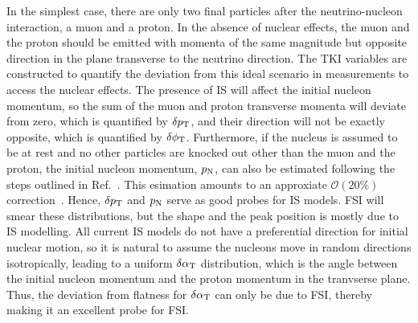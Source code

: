     In the simplest case, there are only two final particles after the neutrino-nucleon interaction, a muon and a proton. 
    In the absence of nuclear effects, the muon and the proton should be emitted with momenta of the same magnitude but opposite direction in the plane transverse to the neutrino direction.
    The TKI variables are constructed to quantify the deviation from this ideal scenario in measurements to access the nuclear effects. 
    The presence of IS will affect the initial nucleon momentum, so the sum of the muon and proton transverse momenta will deviate from zero, which is quantified by $\delta p_\textrm{T}$, and their direction will not be exactly opposite, which is quantified by $\delta\phi_\textrm{T}$.
    Furthermore, if the nucleus is assumed to be at rest and no other particles are knocked out other than the muon and the proton, the initial nucleon momentum, $p_\textrm{N}$, can also be estimated following the steps outlined in Ref.~\cite{Furmanski:2016wqo, Lu:2019nmf}. 
    This esimation amounts to an approxiate  $\mathcal{O}(20\%)$ correction~\cite{Yang:2023dxk}. 
    Hence, $\delta p_\textrm{T}$ and $p_\textrm{N}$ serve as good probes for IS models.
    FSI will smear these distributions, but the shape and the peak position is mostly due to IS modelling.
    All current IS models do not have a preferential direction for initial nuclear motion, so it is natural to assume the nucleons move in random directions isotropically, leading to a uniform $\delta\alpha_\textrm{T}$ distribution, which is the angle between the initial nucleon momentum and the proton momentum in the tranvserse plane. 
    Thus, the deviation from flatness for $\delta\alpha_\textrm{T}$ can only be due to FSI, thereby making it an excellent probe for FSI. 
    
